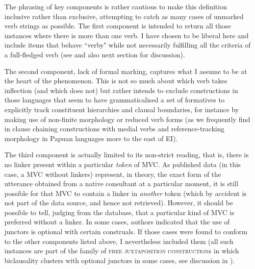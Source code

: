 The phrasing of key components is rather cautious to make this definition inclusive rather than exclusive, attempting to catch as many cases of unmarked verb strings as possible. The first component is intended to return all those instances where there is more than one verb. I have chosen to be liberal here and include items that behave ``verby" while not necessarily fulfilling all the criteria of a full-fledged verb (see  and also next section for discussion). 

The second component, lack of formal marking, captures what I assume to be at the heart of the phenomenon. This is not so much about which verb takes inflection (and which does not) but rather intends to exclude constructions in those languages that seem to have grammaticalised a set of formatives to explicitly track constituent hierarchies and clausal boundaries, for instance by making use of non-finite morphology or reduced verb forms (as we frequently find in clause chaining constructions with medial verbs and reference-tracking morphology in Papuan languages more to the east of EI). 

The third component is actually limited to its non-strict reading, that is, there is no linker present within a particular \emph{token} of MVC. As published data (in this case, a MVC without linkers) represent, in theory, the exact form of the utterance obtained from a native consultant at a particular moment, it is still possible for that MVC to contain a linker in \emph{another} token (which by accident is not part of the data source, and hence not retrieved). However, it should be possible to tell, judging from the database, that a particular kind of MVC is preferred without a linker. In some cases, authors indicated that the use of junctors is optional with certain construals. If those cases were found to conform to the other components listed above, I nevertheless included them (all such instances are part of the family of \textsc{free juxtaposition construction}s in which biclausality clusters with optional junctors in some cases, see discussion in ).

